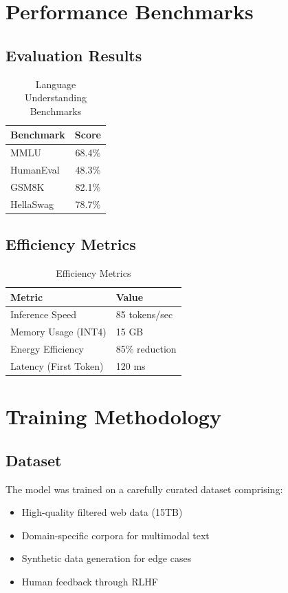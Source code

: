 \documentclass[11pt,a4paper]{article}
\begin{document}
\section{Performance Benchmarks}

\subsection{Evaluation Results}

\begin{table}[H]
\centering
\begin{tabular}{lc}
\toprule
\textbf{Benchmark} & \textbf{Score} \\
\midrule
MMLU & 68.4\% \\
HumanEval & 48.3\% \\
GSM8K & 82.1\% \\
HellaSwag & 78.7\% \\
\bottomrule
\end{tabular}
\caption{Language Understanding Benchmarks}
\end{table}

\subsection{Efficiency Metrics}

\begin{table}[H]
\centering
\begin{tabular}{ll}
\toprule
\textbf{Metric} & \textbf{Value} \\
\midrule
Inference Speed & 85 tokens/sec \\
Memory Usage (INT4) & 15 GB \\
Energy Efficiency & 85\% reduction \\
Latency (First Token) & 120 ms \\
\bottomrule
\end{tabular}
\caption{Efficiency Metrics}
\end{table}

\section{Training Methodology}

\subsection{Dataset}
The model was trained on a carefully curated dataset comprising:
\begin{itemize}
    \item High-quality filtered web data (15TB)
    \item Domain-specific corpora for multimodal text
    \item Synthetic data generation for edge cases
    \item Human feedback through RLHF
\end{itemize}
\end{document}
